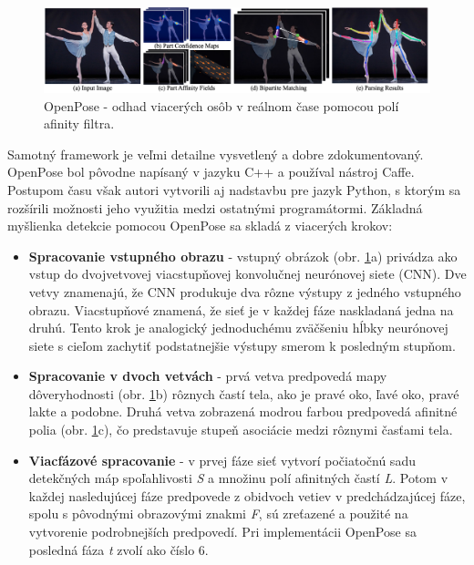 \documentclass[slovak,master,dept460,male,cpp,cpdeclaration]{diploma}
\begin{document}
\begin{figure}[H]
	\centering
	\includegraphics[width=1\textwidth]{Figures/openposePipeline.png}
	\caption{OpenPose - odhad viacerých osôb v reálnom čase pomocou polí afinity filtra.\cite{cao2018openpose}}
	\label{fig:openposeOverall}
\end{figure}

 Samotný framework je veľmi detailne vysvetlený a dobre zdokumentovaný. OpenPose bol pôvodne napísaný v jazyku C++ a používal nástroj Caffe\cite{jia2014caffe}. Postupom času však  autori vytvorili aj  nadstavbu pre jazyk Python, s ktorým sa rozšírili možnosti jeho využitia medzi ostatnými programátormi. Základná myšlienka detekcie pomocou OpenPose sa skladá z viacerých krokov:

\begin{itemize}
\item \textbf{Spracovanie vstupného obrazu} - vstupný obrázok (obr. \ref{fig:openposeOverall}a) privádza ako vstup do dvojvetvovej viacstupňovej konvolučnej neurónovej siete (CNN). Dve vetvy znamenajú, že CNN produkuje dva rôzne výstupy z jedného vstupného obrazu. Viacstupňové znamená, že sieť je v každej fáze naskladaná jedna na druhú. Tento krok je analogický jednoduchému zväčšeniu hĺbky neurónovej siete s cieľom zachytiť podstatnejšie výstupy smerom k posledným stupňom.

\item \textbf{Spracovanie v dvoch vetvách} - prvá vetva predpovedá mapy dôveryhodnosti (obr. \ref{fig:openposeOverall}b) rôznych častí tela, ako je pravé oko, ľavé oko, pravé lakte a podobne. Druhá vetva zobrazená modrou farbou predpovedá afinitné polia (obr. \ref{fig:openposeOverall}c), čo predstavuje stupeň asociácie medzi rôznymi časťami tela.

\item \textbf{Viacfázové spracovanie} - v prvej fáze sieť vytvorí počiatočnú sadu detekčných máp spoľahlivosti \textit{S} a množinu polí afinitných častí \textit{L}. Potom v každej nasledujúcej fáze predpovede z obidvoch vetiev v predchádzajúcej fáze, spolu s pôvodnými obrazovými znakmi \textit{F}, sú zreťazené a použité na vytvorenie podrobnejších predpovedí. Pri implementácii OpenPose sa posledná fáza \textit{t} zvolí ako číslo 6.
\end{itemize}
\end{document}
